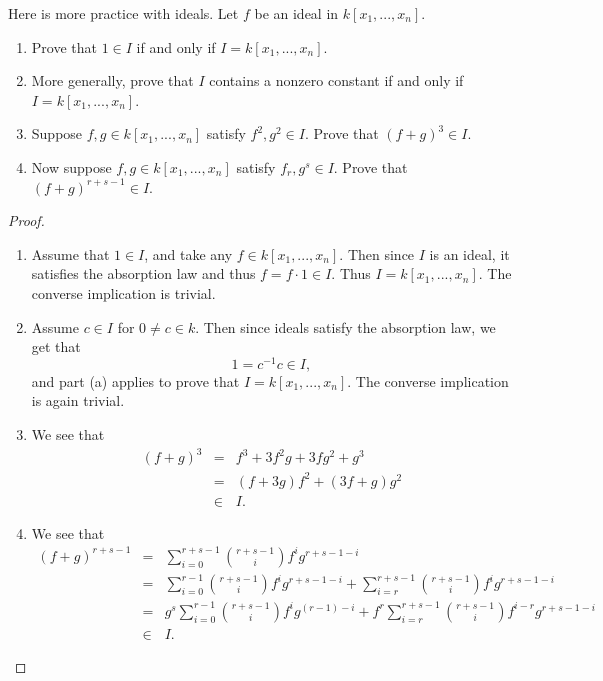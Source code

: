 \begin{exercise}{16}
Here is more practice with ideals. Let $f$ be an ideal in $k[x_1,...,x_n]$.
\begin{enumerate}
    \item Prove that $1\in I$ if and only if $I = k[x_1,...,x_n]$.
    \item More generally, prove that $I$ contains a nonzero constant if and only if $I = k[x_1,...,x_n]$.
    \item Suppose $f,g\in k[x_1,...,x_n]$ satisfy $f^2,g^2\in I$. Prove that $(f+g)^3\in I$.
    \item Now suppose $f,g\in k[x_1,...,x_n]$ satisfy $f_r, g^s\in I$. Prove that $(f+g)^{r+s-1}\in I$.
\end{enumerate}
\end{exercise}
\begin{proof}
    \begin{enumerate}
        \item Assume that $1\in I$, and take any $f\in k[x_1,...,x_n]$. Then since $I$ is an ideal, it satisfies the absorption law and thus $f = f\cdot 1\in I$. Thus $I = k[x_1,...,x_n]$. The converse implication is trivial.
        \item Assume $c\in I$ for $0\neq c\in k$. Then since ideals satisfy the absorption law, we get that
        $$1 = c^{-1}c \in I,$$
        and part (a) applies to prove that $I = k[x_1,...,x_n]$. The converse implication is again trivial.
        \item We see that
        \begin{eqnarray*}
            (f+g)^3
            & = & f^3 + 3f^2 g + 3fg^2 + g^3\\
            & = & (f + 3g)f^2 + (3f + g)g^2\\
            & \in & I.
        \end{eqnarray*}
        \item We see that
        \begin{eqnarray*}
            (f+g)^{r+s-1}
            & = & \sum_{i=0}^{r+s-1} \binom{r+s-1}{i} f^i g^{r+s-1-i}\\
            & = & \sum_{i=0}^{r-1}  \binom{r+s-1}{i} f^i g^{r+s-1-i} + \sum_{i=r}^{r+s-1}  \binom{r+s-1}{i} f^i g^{r+s-1-i}\\
            & = & g^s\sum_{i=0}^{r-1}  \binom{r+s-1}{i} f^i g^{(r-1)-i} + f^r\sum_{i=r}^{r+s-1}  \binom{r+s-1}{i} f^{i-r} g^{r+s-1-i}\\
            & \in & I.
        \end{eqnarray*}
    \end{enumerate}
\end{proof}

